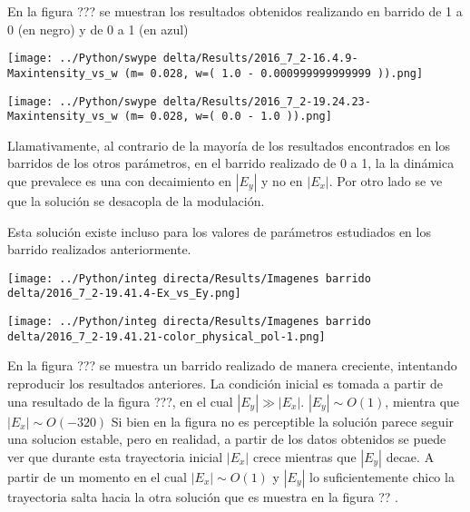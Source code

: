 		En la figura ??? se muestran los resultados obtenidos realizando en barrido de 1 a 0 (en negro) y de 0 a 1 (en azul) 
		
				\begin{minipage}{0.5\textwidth}
					\centering
					\texttt{[image: ../Python/swype delta/Results/2016\_7\_2-16.4.9-Maxintensity\_vs\_w (m= 0.028, w=( 1.0 - 0.000999999999999 )).png]}
				\end{minipage}	
				\begin{minipage}{0.5\textwidth}
					\centering
					\texttt{[image: ../Python/swype delta/Results/2016\_7\_2-19.24.23-Maxintensity\_vs\_w (m= 0.028, w=( 0.0 - 1.0 )).png]}
				\end{minipage}	
				
				Llamativamente, al contrario de la mayoría de los resultados encontrados en los barridos de los otros parámetros, en el barrido realizado de 0 a 1, la la dinámica que prevalece es una con decaimiento en $|E_y|$ y no en $|E_x|$. Por otro lado se ve que la solución se desacopla de la modulación. 
				
				Esta solución existe incluso para los valores de parámetros estudiados en los barrido realizados anteriormente.
				
				\begin{minipage}{0.5\textwidth}
					\centering
					\texttt{[image: ../Python/integ directa/Results/Imagenes barrido delta/2016\_7\_2-19.41.4-Ex\_vs\_Ey.png]}
				\end{minipage}	
				\begin{minipage}{0.5\textwidth}
					\centering
					\texttt{[image: ../Python/integ directa/Results/Imagenes barrido delta/2016\_7\_2-19.41.21-color\_physical\_pol-1.png]}
				\end{minipage}			
				
			
				En la figura ??? se muestra un barrido realizado de manera creciente, intentando reproducir los resultados anteriores.
				La condición inicial es tomada a partir de una resultado de la figura ???, en el cual $|E_y| \gg |E_x|$. 
				$|E_y|\sim O(1)$,  mientra que  $|E_x| \sim O(-320)$
				Si bien en la figura no es perceptible la solución parece seguir una solucion estable, pero en realidad, a partir de los datos obtenidos se puede ver que durante esta trayectoria inicial $|E_x|$ crece mientras que $|E_y|$ decae. A partir de un momento en el cual $|E_x| \sim O(1)$ y $|E_y|$ lo suficientemente chico la trayectoria salta hacia la otra solución que es muestra en la figura ?? .
				
